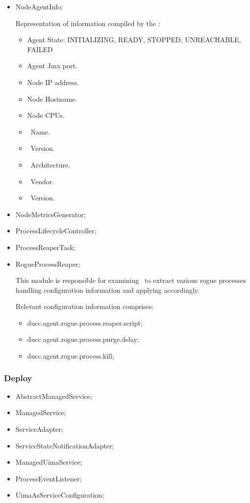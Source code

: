 \begin{itemize}
\begin{itemize}
      \item NodeAgentInfo;
      
      Representation of information compiled by the \varAgent:
      
      \begin{itemize}
      \item Agent State: INITIALIZING, READY, STOPPED, UNREACHABLE, FAILED
      \item Agent Jmx port.
      \item Node IP address.
      \item Node Hostname.
      \item Node CPUs.
      \item \varOS~Name.
      \item \varOS~Version.
      \item \varOS~Architecture.
      \item \varJava~Vendor.
      \item \varJava~Version.
      \end{itemize}
      
      \item NodeMetricsGenerator;
      \item ProcessLifecycleController;
      \item ProcessReaperTask;
      \item RogueProcessReaper;
      
      This module is responsible for examining \varDuccProperties~to
      extract various rogue processes handling configuration
      information and applying accordingly.
      
      Relevant configuration information comprises:
      \begin{itemize}
        \item ducc.agent.rogue.process.reaper.script;
        \item ducc.agent.rogue.process.purge.delay;
        \item ducc.agent.rogue.process.kill;
      \end{itemize}
      
    \end{itemize}
    
    \subsubsection{Deploy} 
    
    \begin{itemize}
      \item AbstractManagedService;
      \item ManagedService;
      \item ServiceAdapter;
      \item ServiceStateNotificationAdapter;
      \item ManagedUimaService;
      \item ProcessEventListener;
      \item UimaAsServiceConfiguration;
    \end{itemize}
    

\end{itemize}
